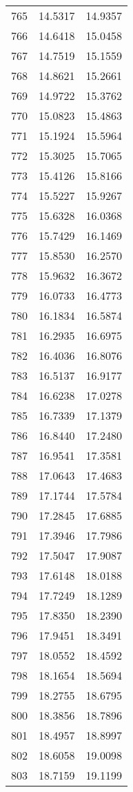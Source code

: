 \documentclass{article}
\begin{document}
\begin{longtable}{|c|c|c|}
765 & 14.5317 & 14.9357 \\
766 & 14.6418 & 15.0458 \\
767 & 14.7519 & 15.1559 \\
768 & 14.8621 & 15.2661 \\
769 & 14.9722 & 15.3762 \\
770 & 15.0823 & 15.4863 \\
771 & 15.1924 & 15.5964 \\
772 & 15.3025 & 15.7065 \\
773 & 15.4126 & 15.8166 \\
774 & 15.5227 & 15.9267 \\
775 & 15.6328 & 16.0368 \\
776 & 15.7429 & 16.1469 \\
777 & 15.8530 & 16.2570 \\
778 & 15.9632 & 16.3672 \\
779 & 16.0733 & 16.4773 \\
780 & 16.1834 & 16.5874 \\
781 & 16.2935 & 16.6975 \\
782 & 16.4036 & 16.8076 \\
783 & 16.5137 & 16.9177 \\
784 & 16.6238 & 17.0278 \\
785 & 16.7339 & 17.1379 \\
786 & 16.8440 & 17.2480 \\
787 & 16.9541 & 17.3581 \\
788 & 17.0643 & 17.4683 \\
789 & 17.1744 & 17.5784 \\
790 & 17.2845 & 17.6885 \\
791 & 17.3946 & 17.7986 \\
792 & 17.5047 & 17.9087 \\
793 & 17.6148 & 18.0188 \\
794 & 17.7249 & 18.1289 \\
795 & 17.8350 & 18.2390 \\
796 & 17.9451 & 18.3491 \\
797 & 18.0552 & 18.4592 \\
798 & 18.1654 & 18.5694 \\
799 & 18.2755 & 18.6795 \\
800 & 18.3856 & 18.7896 \\
801 & 18.4957 & 18.8997 \\
802 & 18.6058 & 19.0098 \\
803 & 18.7159 & 19.1199 \\

\end{longtable}
\end{document}
